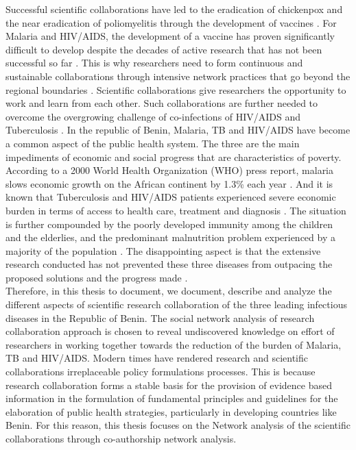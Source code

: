 Successful scientific collaborations have led to the eradication of chickenpox and the near eradication of poliomyelitis through the development of vaccines \cite{jamison_disease_2006}. For Malaria and HIV/AIDS, the development of a vaccine has proven significantly difficult to develop despite the decades of active research that has not been successful so far \cite{long_malaria_2016,titti_problems_2007,walker_toward_2008}. This is why researchers need to form continuous and sustainable collaborations through intensive network practices that go beyond the regional boundaries \cite{newman_structure_2001}. Scientific collaborations give researchers the opportunity to work and learn from each other. Such collaborations are further needed to overcome the overgrowing challenge of co-infections of HIV/AIDS and Tuberculosis \cite{corbett_growing_2003,gandhi_hiv_2010}. In the republic of Benin, Malaria, TB and HIV/AIDS have become a common aspect of the public health system. The three are the main impediments of economic and social progress that are characteristics of poverty. According to a 2000 World Health Organization (WHO) press report, malaria slows economic growth on the African continent by 1.3\% each year \cite{world_health_organization_economic_2000}. And it is known that Tuberculosis and HIV/AIDS patients experienced severe economic burden in terms of access to health care, treatment and diagnosis \cite{richter_economic_2014}. The situation is further compounded by the poorly developed immunity among the children and the elderlies, and the predominant malnutrition problem experienced by a majority of the population \cite{jamison_disease_2006}. The disappointing aspect is that the extensive research conducted has not prevented these three diseases from outpacing the proposed solutions and the progress made \cite{akukwe_dont_2006}.\\
Therefore, in this thesis to document, we document, describe and analyze the different aspects of scientific research collaboration of the three leading infectious diseases in the Republic of Benin. The social network analysis of research collaboration approach is chosen to reveal undiscovered knowledge on effort of researchers in working together towards the reduction of the burden of Malaria, TB and HIV/AIDS. Modern times have rendered research and scientific collaborations irreplaceable policy formulations processes. This is because research collaboration forms a stable basis for the provision of evidence based information in the formulation of fundamental principles and guidelines for the elaboration of public health strategies, particularly in developing countries like Benin. For this reason, this thesis focuses on the Network analysis of the scientific collaborations through co-authorship network analysis.
